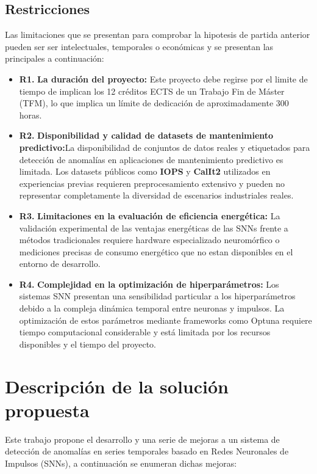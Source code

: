 \subsection{Restricciones}
Las limitaciones que se presentan para comprobar la hipotesis de partida anterior pueden ser ser intelectuales, temporales o económicas y se presentan las principales a continuación:
\begin{itemize}
    \item \textbf{R1.} \textbf{La duración del proyecto:} Este proyecto debe regirse por el limite de tiempo de implican los 12 créditos ECTS de un Trabajo Fin de Máster (TFM), lo que implica un límite de dedicación de aproximadamente 300 horas.
    \item \textbf{R2.} \textbf{Disponibilidad y calidad de datasets de mantenimiento predictivo:}La disponibilidad de conjuntos de datos reales y etiquetados para detección de anomalías en aplicaciones de mantenimiento predictivo es limitada. Los datasets públicos como \textbf{IOPS} y \textbf{CalIt2} utilizados en experiencias previas requieren preprocesamiento extensivo y pueden no representar completamente la diversidad de escenarios industriales reales.
    \item \textbf{R3.} \textbf{Limitaciones en la evaluación de eficiencia energética:} La validación experimental de las ventajas energéticas de las SNNs frente a métodos tradicionales requiere hardware especializado neuromórfico o mediciones precisas de consumo energético que no estan disponibles en el entorno de desarrollo.
    \item \textbf{R4.} \textbf{Complejidad en la optimización de hiperparámetros:} Los sistemas SNN presentan una sensibilidad particular a los hiperparámetros debido a la compleja dinámica temporal entre neuronas y impulsos. La optimización de estos parámetros mediante frameworks como Optuna requiere tiempo computacional considerable y está limitada por los recursos disponibles y el tiempo del proyecto.
\end{itemize}

\section{Descripción de la solución propuesta}

Este trabajo propone el desarrollo y una serie de mejoras a un sistema de detección de anomalías en series temporales basado en Redes Neuronales de Impulsos (SNNs), a continuación se enumeran dichas mejoras:

